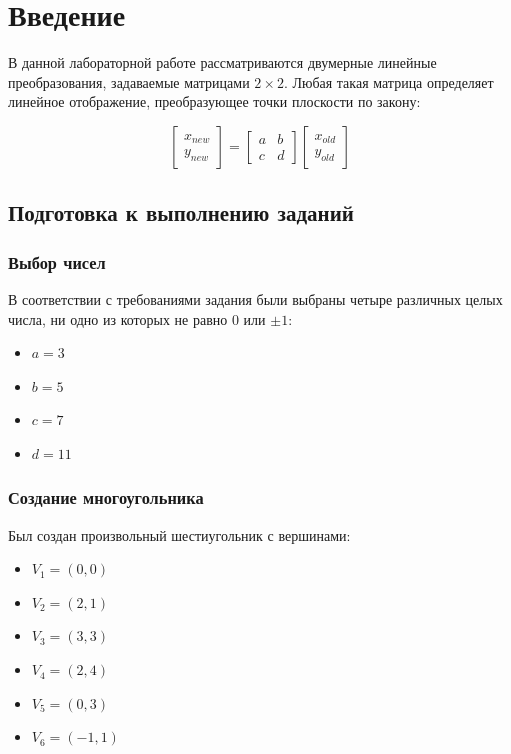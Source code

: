 \section*{Введение}

В данной лабораторной работе рассматриваются двумерные линейные преобразования, задаваемые матрицами $2 \times 2$. Любая такая матрица определяет линейное отображение, преобразующее точки плоскости по закону:

\begin{equation}
\begin{bmatrix} x_{new} \\ y_{new} \end{bmatrix} = 
\begin{bmatrix} a & b \\ c & d \end{bmatrix}
\begin{bmatrix} x_{old} \\ y_{old} \end{bmatrix}
\end{equation}

\subsection*{Подготовка к выполнению заданий}

\subsubsection*{Выбор чисел}

В соответствии с требованиями задания были выбраны четыре различных целых числа, ни одно из которых не равно 0 или $\pm 1$:

\begin{itemize}
\item $a = 3$
\item $b = 5$ 
\item $c = 7$
\item $d = 11$
\end{itemize}

\subsubsection*{Создание многоугольника}

Был создан произвольный шестиугольник с вершинами:
\begin{itemize}
\item $V_1 = (0, 0)$
\item $V_2 = (2, 1)$
\item $V_3 = (3, 3)$
\item $V_4 = (2, 4)$
\item $V_5 = (0, 3)$
\item $V_6 = (-1, 1)$
\end{itemize}

